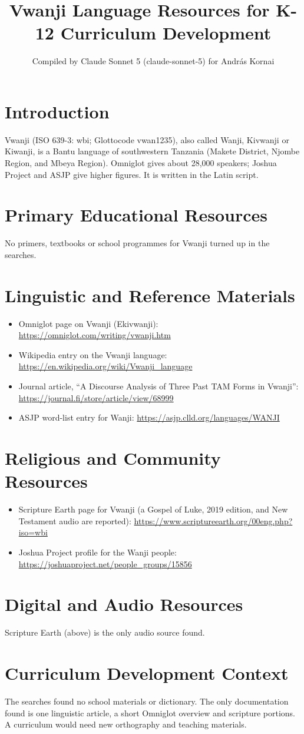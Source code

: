 \documentclass[12pt]{article}
\title{Vwanji Language Resources for K-12 Curriculum Development}
\author{Compiled by Claude Sonnet 5 (claude-sonnet-5) for Andr\'as Kornai}
\date{}
\begin{document}
\maketitle

\section{Introduction}
Vwanji (ISO 639-3: wbi; Glottocode vwan1235), also called Wanji, Kivwanji or Kiwanji, is a Bantu language of southwestern Tanzania (Makete District, Njombe Region, and Mbeya Region). Omniglot gives about 28,000 speakers; Joshua Project and ASJP give higher figures. It is written in the Latin script.

\section{Primary Educational Resources}
No primers, textbooks or school programmes for Vwanji turned up in the searches.

\section{Linguistic and Reference Materials}
\begin{itemize}
\item Omniglot page on Vwanji (Ekivwanji): \url{https://omniglot.com/writing/vwanji.htm}
\item Wikipedia entry on the Vwanji language: \url{https://en.wikipedia.org/wiki/Vwanji_language}
\item Journal article, ``A Discourse Analysis of Three Past TAM Forms in Vwanji'': \url{https://journal.fi/store/article/view/68999}
\item ASJP word-list entry for Wanji: \url{https://asjp.clld.org/languages/WANJI}
\end{itemize}

\section{Religious and Community Resources}
\begin{itemize}
\item Scripture Earth page for Vwanji (a Gospel of Luke, 2019 edition, and New Testament audio are reported): \url{https://www.scriptureearth.org/00eng.php?iso=wbi}
\item Joshua Project profile for the Wanji people: \url{https://joshuaproject.net/people_groups/15856}
\end{itemize}

\section{Digital and Audio Resources}
Scripture Earth (above) is the only audio source found.

\section{Curriculum Development Context}
The searches found no school materials or dictionary. The only documentation found is one linguistic article, a short Omniglot overview and scripture portions. A curriculum would need new orthography and teaching materials.
\end{document}

